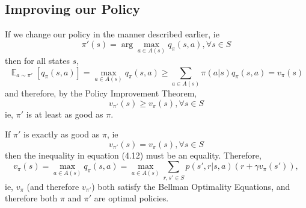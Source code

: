 \documentclass[12pt]{report}
\begin{document}


\subsection{Improving our Policy}
If we change our policy in the manner described earlier, ie 
\begin{equation}
    \pi'(s) = \arg\max\limits_{a \in A(s)} q_{\pi}(s, a), \forall s \in S
\end{equation}
then for all states $s$,
\begin{equation}
    \mathop{\mathbb{E}}_{a \sim \pi'}\left[q_{\pi}(s, a)\right] = \max\limits_{a \in A(s)} q_{\pi}(s, a) \geq \sum\limits_{a \in A(s)} \pi(a | s) q_{\pi}(s, a) = v_{\pi}(s)
\end{equation}
and therefore, by the Policy Improvement Theorem,
\begin{equation}
    v_{\pi'}(s) \geq v_{\pi}(s), \forall s \in S
\end{equation}
ie, $\pi'$ is at least as good as $\pi$.

If $\pi'$ is exactly as good as $\pi$, ie 
\begin{equation}
    v_{\pi'}(s) = v_{\pi}(s), \forall s \in S
\end{equation}
then the inequality in equation (4.12) must be an equality. Therefore, 
\begin{equation}
    v_{\pi}(s) = \max\limits_{a \in A(s)} q_{\pi}(s, a) = \max\limits_{a \in A(s)} \sum\limits_{r, s' \in S} p(s', r | s, a)(r + \gamma v_{\pi}(s')),
\end{equation}
ie, $v_{\pi}$ (and therefore $v_{\pi'}$) both satisfy the Bellman Optimality Equations, and therefore both $\pi$ and $\pi'$ are optimal policies.
\end{document}
